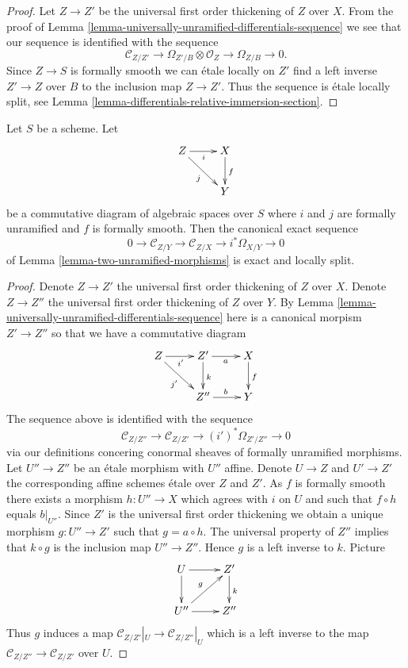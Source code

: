 \begin{proof}
Let $Z \to Z'$ be the universal first order thickening of $Z$ over $X$.
From the proof of
Lemma \ref{lemma-universally-unramified-differentials-sequence}
we see that our sequence is identified with the sequence
$$
\mathcal{C}_{Z/Z'} \to \Omega_{Z'/B} \otimes \mathcal{O}_Z \to
\Omega_{Z/B} \to 0.
$$
Since $Z \to S$ is formally smooth we can \'etale locally on $Z'$ find
a left inverse $Z' \to Z$ over $B$ to the inclusion map $Z \to Z'$.
Thus the sequence is \'etale locally split, see
Lemma \ref{lemma-differentials-relative-immersion-section}.
\end{proof}

\begin{lemma}
\label{lemma-two-unramified-morphisms-formally-smooth}
Let $S$ be a scheme. Let
$$
\xymatrix{
Z \ar[r]_i \ar[rd]_j & X \ar[d]^f \\
& Y
}
$$
be a commutative diagram of algebraic spaces over $S$
where $i$ and $j$ are formally unramified and $f$ is formally smooth.
Then the canonical exact sequence
$$
0 \to
\mathcal{C}_{Z/Y} \to
\mathcal{C}_{Z/X} \to
i^*\Omega_{X/Y} \to 0
$$
of
Lemma \ref{lemma-two-unramified-morphisms}
is exact and locally split.
\end{lemma}

\begin{proof}
Denote $Z \to Z'$ the universal first order thickening of $Z$ over $X$.
Denote $Z \to Z''$ the universal first order thickening of $Z$ over $Y$.
By
Lemma \ref{lemma-universally-unramified-differentials-sequence}
here is a canonical morpism $Z' \to Z''$ so that we have a commutative
diagram
$$
\xymatrix{
Z \ar[r]_{i'} \ar[rd]_{j'} & Z' \ar[r]_a \ar[d]^k & X \ar[d]^f \\
& Z'' \ar[r]^b & Y
}
$$
The sequence above is identified with the sequence
$$
\mathcal{C}_{Z/Z''} \to
\mathcal{C}_{Z/Z'} \to
(i')^*\Omega_{Z'/Z''} \to 0
$$
via our definitions concering conormal sheaves of formally unramified
morphisms. Let $U'' \to Z''$ be an \'etale morphism with $U''$ affine.
Denote $U \to Z$ and $U' \to Z'$ the corresponding affine
schemes \'etale over $Z$ and $Z'$.
As $f$ is formally smooth there exists a morphism $h : U'' \to X$
which agrees with $i$ on $U$ and such that $f \circ h$ equals $b|_{U''}$.
Since $Z'$ is the universal first order thickening we obtain a unique
morphism $g : U'' \to Z'$ such that $g = a \circ h$. The universal
property of $Z''$ implies that $k \circ g$ is the inclusion map
$U'' \to Z''$. Hence $g$ is a left inverse to $k$. Picture
$$
\xymatrix{
U \ar[d] \ar[r] & Z' \ar[d]^k \\
U'' \ar[r] \ar[ru]^g & Z''
}
$$
Thus $g$ induces a map $\mathcal{C}_{Z/Z'}|_U \to \mathcal{C}_{Z/Z''}|_U$
which is a left inverse to the map
$\mathcal{C}_{Z/Z''} \to \mathcal{C}_{Z/Z'}$ over $U$.
\end{proof}
















